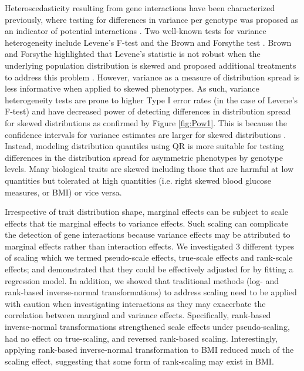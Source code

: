 \documentclass[12pt]{article}
\begin{document}
Heteroscedasticity resulting from gene interactions have been characterized previously, where testing for differences in variance per genotype was proposed as an indicator of potential interactions \cite{struchalin2010variance,pare2010use}. Two well-known tests for variance heterogeneity include Levene's F-test and the Brown and Forsythe test \cite{levene1960robust, brown1974robust}. Brown and Forsythe highlighted that Levene's statistic is not robust when the underlying population distribution is skewed and proposed additional treatments to address this problem \cite{brown1974robust}. However, variance as a measure of distribution spread is less informative when applied to skewed phenotypes. As such, variance heterogeneity tests are prone to higher Type I error rates (in the case of Levene's F-test) and have decreased power of detecting differences in distribution spread for skewed distributions as confirmed by Figure \ref{fig:Pow1}. This is because the confidence intervals for variance estimates are larger for skewed distributions \cite{lee1998testing}. Instead, modeling distribution quantiles using QR is more suitable for testing differences in the distribution spread for asymmetric phenotypes by genotype levels. Many biological traits are skewed including those that are harmful at low quantities but tolerated at high quantities (i.e. right skewed blood glucose measures, or BMI) or vice versa. 

Irrespective of trait distribution shape, marginal effects can be subject to scale effects that tie marginal effects to variance effects. Such scaling can complicate the detection of gene interactions because variance effects may be attributed to marginal effects rather than interaction effects. We investigated 3 different types of scaling which we termed pseudo-scale effects, true-scale effects and rank-scale effects; and demonstrated that they could be effectively adjusted for by fitting a regression model. In addition, we showed that traditional methods (log- and rank-based inverse-normal transformations) to address scaling need to be applied with caution when investigating interactions as they may exacerbate the correlation between marginal and variance effects. Specifically, rank-based inverse-normal transformations strengthened scale effects under pseudo-scaling, had no effect on true-scaling, and reversed rank-based scaling. Interestingly, applying rank-based inverse-normal transformation to BMI reduced much of the scaling effect, suggesting that some form of rank-scaling may exist in BMI.
\end{document}
